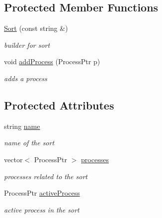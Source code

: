 \subsection*{\-Protected \-Member \-Functions}
\begin{DoxyCompactItemize}
\item 
\hypertarget{class_sort_ab9d3cb2bb873e058d0129e793c947d45}{\hyperlink{class_sort_ab9d3cb2bb873e058d0129e793c947d45}{\-Sort} (const string \&)}\label{class_sort_ab9d3cb2bb873e058d0129e793c947d45}

\begin{DoxyCompactList}\small\item\em builder for sort \end{DoxyCompactList}\item 
void \hyperlink{class_sort_a63bd04693623b2a269e76b9d5269e880}{add\-Process} (\-Process\-Ptr p)
\begin{DoxyCompactList}\small\item\em adds a process \end{DoxyCompactList}\end{DoxyCompactItemize}
\subsection*{\-Protected \-Attributes}
\begin{DoxyCompactItemize}
\item 
\hypertarget{class_sort_a047fd7c62ee90060e2e9374f6dc9ceca}{string \hyperlink{class_sort_a047fd7c62ee90060e2e9374f6dc9ceca}{name}}\label{class_sort_a047fd7c62ee90060e2e9374f6dc9ceca}

\begin{DoxyCompactList}\small\item\em name of the sort \end{DoxyCompactList}\item 
\hypertarget{class_sort_abd772622b6c5b12de38d3a646258cc0a}{vector$<$ \-Process\-Ptr $>$ \hyperlink{class_sort_abd772622b6c5b12de38d3a646258cc0a}{processes}}\label{class_sort_abd772622b6c5b12de38d3a646258cc0a}

\begin{DoxyCompactList}\small\item\em processes related to the sort \end{DoxyCompactList}\item 
\hypertarget{class_sort_a941e734fb42ff8042ba0d4e82f22a9d8}{\-Process\-Ptr \hyperlink{class_sort_a941e734fb42ff8042ba0d4e82f22a9d8}{active\-Process}}\label{class_sort_a941e734fb42ff8042ba0d4e82f22a9d8}

\begin{DoxyCompactList}\small\item\em active process in the sort \end{DoxyCompactList}\end{DoxyCompactItemize}


